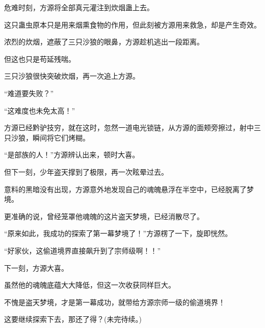 \begin{this_body}
危难时刻，方源将全部真元灌注到炊烟蛊上去。

这只蛊虫原本只是用来烟熏食物的作用，但此刻被方源用来救急，却是产生奇效。

浓烈的炊烟，遮蔽了三只沙狼的眼鼻，方源趁机逃出一段距离。

但这也只是苟延残喘。

三只沙狼很快突破炊烟，再一次追上方源。

“难道要失败？”

“这难度也未免太高！”

方源已经黔驴技穷，就在这时，忽然一道电光锁链，从方源的面颊旁擦过，射中三只沙狼，瞬间将它们烤糊。

“是部族的人！”方源辨认出来，顿时大喜。

但下一刻，少年盗天撑到了极限，再一次眩晕过去。

意料的黑暗没有出现，方源意外地发现自己的魂魄悬浮在半空中，已经脱离了梦境。

更准确的说，曾经笼罩他魂魄的这片盗天梦境，已经消散尽了。

“原来如此，我成功的探索了第一幕梦境了！”方源楞了一下，旋即恍然。

“好家伙，这偷道境界直接飙升到了宗师级啊！！”

下一刻，方源大喜。

虽然他的魂魄底蕴大大降低，但这一次收获同样巨大。

不愧是盗天梦境，才是第一幕成功，就带给方源宗师一级的偷道境界！

这要继续探索下去，那还了得？(未完待续。)

\end{this_body}

